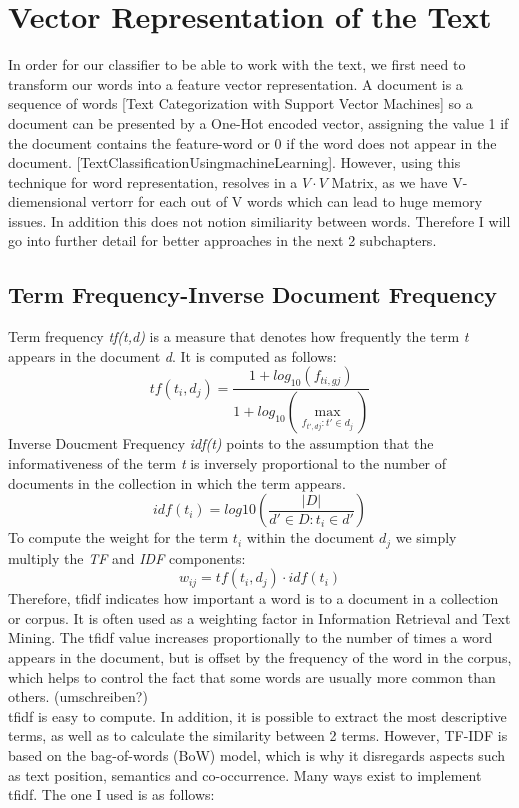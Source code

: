 \documentclass[a4paper, 11pt,titlepage,oneside,openany]{book}
\begin{document}
\section{Vector Representation of the Text}
In order for our classifier to be able to work with the text, we first need to transform our words into a feature vector representation. A document is a sequence of words [Text Categorization with Support Vector Machines] so a document can be presented by a One-Hot encoded vector, assigning the value 1 if the document contains the feature-word or 0 if the word does not appear in the document. [TextClassificationUsingmachineLearning]. However, using this technique for word representation, resolves in a $V \cdot V$ Matrix, as we have V-diemensional vertorr for each out of V words which can lead to huge memory issues. In addition this does not notion similiarity between words. Therefore I will go into further detail for better approaches in the next 2 subchapters.

\subsection{Term Frequency-Inverse Document Frequency}
Term frequency \textit{tf(t,d)} is a measure that denotes how frequently the term \textit{t} appears in the document \textit{d}. It is computed as follows: \\
\[
	tf(t_i, d_j)=\frac{1+log_{10}(f_{ti,gj})}{1+log_{10}(\max_{f_{t', dj}:t'\in d_j})}
\]
Inverse Doucment Frequency \textit{idf(t)} points to the assumption that the informativeness of the term \textit{t} is inversely proportional to the number of documents in the collection in which the term appears.\\
\[
	idf(t_i)=log{10}(\frac{|D|}{d' \in D : t_i \in d'})
\]
To compute the weight for the term $t_i$ within the document $d_j$ we simply multiply the \textit{TF} and \textit{IDF} components:
\[
	w_{ij}=tf(t_i, d_j)\cdot idf(t_i)
\]
Therefore, \Gls{tfidf} indicates how important a word is to a document in a collection or corpus. It is often used as a weighting factor in Information Retrieval and Text Mining. The \Gls{tfidf} value increases proportionally to the number of times a word appears in the document, but is offset by the frequency of the word in the corpus, which helps to control the fact that some words are usually more common than others. (umschreiben?) \\
\noindent \Gls{tfidf} is easy to compute. In addition, it is possible to extract the most descriptive terms, as well as to calculate the similarity between 2 terms. However, TF-IDF is based on the bag-of-words (BoW) model, which is why it disregards aspects such as text position, semantics and co-occurrence.
Many ways exist to implement \Gls{tfidf}. The one I used is as follows:\\
\end{document}
